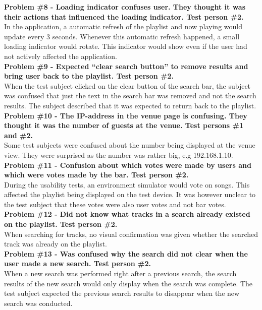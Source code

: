 \noindent\textbf{Problem \#8 - Loading indicator confuses user. They thought it was their actions
    that influenced the loading indicator. Test person \#2.}\\
  In the application, a automatic refresh of the playlist and
  now playing would update every 3 seconds. Whenever this automatic
  refresh happened, a small loading indicator would rotate. This
  indicator would show even if the user had not actively affected the application.\\

\noindent\textbf{Problem \#9 - Expected \enquote{clear search button}
  to remove results and bring user back to the playlist. Test person \#2.}\\
  When the test subject clicked on the clear button of the search bar,
  the subject was confused that just the text in the search bar was
  removed and not the search results. The subject described that it
  was expected to return back to the playlist.\\

\noindent\textbf{Problem \#10 - The IP-address in the venue page is
  confusing. They thought it was the number of guests at the venue. Test persons \#1 and \#2.}\\
  Some test subjects were confused about the number being displayed at
  the venue view. They were surprised as the number was rather big,
  e.g 192.168.1.10.\\

\noindent\textbf{Problem \#11 - Confusion about which votes were made by users and which were
    votes made by the bar. Test person \#2.}\\
  During the usability tests, an environment simulator would vote on
  songs. This affected the playlist being displayed on the test
  device. It was however unclear to the test subject that these votes
  were also user votes and not bar votes.\\

\noindent\textbf{Problem \#12 - Did not know what tracks in a search already existed on the
    playlist. Test person \#2.}\\
  When searching for tracks, no visual confirmation was given whether
  the searched track was already on the playlist.\\

\noindent\textbf{Problem \#13 - Was confused why the search did not
  clear when the user made a new search. Test person \#2.}\\
  When a new search was performed right after a previous search, the
  search results of the new search would only display when the search
  was complete. The test subject expected the previous search results
  to disappear when the new search was conducted.\\

